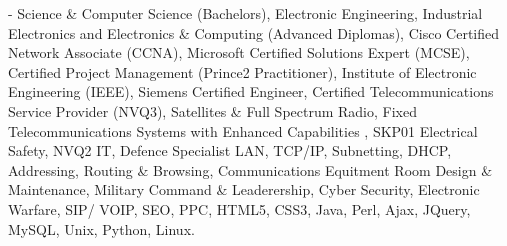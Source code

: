 \documentclass[letterpaper,10pt,openany,oneside,english]{sphinxmanual}
\begin{document}
 - Science \& Computer Science (Bachelors), Electronic Engineering, Industrial Electronics and Electronics \& Computing (Advanced Diplomas), Cisco Certified Network Associate (CCNA), Microsoft Certified Solutions Expert (MCSE), Certified Project Management (Prince2 Practitioner), Institute of Electronic Engineering (IEEE), Siemens Certified Engineer, Certified Telecommunications Service Provider (NVQ3), Satellites \& Full Spectrum Radio, Fixed Telecommunications Systems with Enhanced Capabilities , SKP01 Electrical Safety, NVQ2 IT, Defence Specialist LAN, TCP/IP, Subnetting, DHCP, Addressing, Routing \& Browsing, Communications Equitment Room Design \& Maintenance, Military Command \& Leaderership,  Cyber Security, Electronic Warfare, SIP/ VOIP, SEO, PPC, HTML5, CSS3, Java, Perl, Ajax, JQuery, MySQL, Unix, Python, Linux.



\renewcommand{\indexname}{Index}
\printindex
\end{document}
